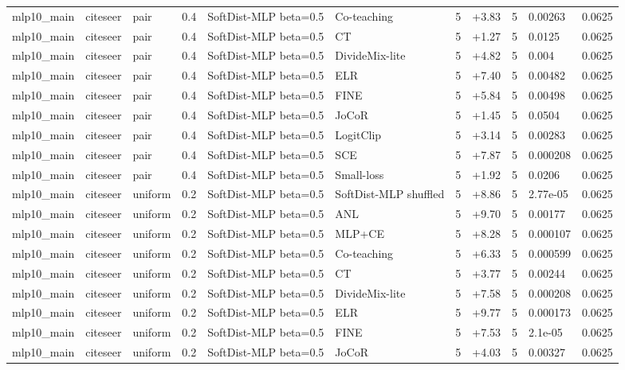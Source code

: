 \begin{table}[t]
\begin{tabular}{llllllrlrll}
mlp10_main & citeseer & pair & 0.4 & SoftDist-MLP beta=0.5 & Co-teaching & 5 & +3.83 & 5 & 0.00263 & 0.0625 \\
mlp10_main & citeseer & pair & 0.4 & SoftDist-MLP beta=0.5 & CT & 5 & +1.27 & 5 & 0.0125 & 0.0625 \\
mlp10_main & citeseer & pair & 0.4 & SoftDist-MLP beta=0.5 & DivideMix-lite & 5 & +4.82 & 5 & 0.004 & 0.0625 \\
mlp10_main & citeseer & pair & 0.4 & SoftDist-MLP beta=0.5 & ELR & 5 & +7.40 & 5 & 0.00482 & 0.0625 \\
mlp10_main & citeseer & pair & 0.4 & SoftDist-MLP beta=0.5 & FINE & 5 & +5.84 & 5 & 0.00498 & 0.0625 \\
mlp10_main & citeseer & pair & 0.4 & SoftDist-MLP beta=0.5 & JoCoR & 5 & +1.45 & 5 & 0.0504 & 0.0625 \\
mlp10_main & citeseer & pair & 0.4 & SoftDist-MLP beta=0.5 & LogitClip & 5 & +3.14 & 5 & 0.00283 & 0.0625 \\
mlp10_main & citeseer & pair & 0.4 & SoftDist-MLP beta=0.5 & SCE & 5 & +7.87 & 5 & 0.000208 & 0.0625 \\
mlp10_main & citeseer & pair & 0.4 & SoftDist-MLP beta=0.5 & Small-loss & 5 & +1.92 & 5 & 0.0206 & 0.0625 \\
mlp10_main & citeseer & uniform & 0.2 & SoftDist-MLP beta=0.5 & SoftDist-MLP shuffled & 5 & +8.86 & 5 & 2.77e-05 & 0.0625 \\
mlp10_main & citeseer & uniform & 0.2 & SoftDist-MLP beta=0.5 & ANL & 5 & +9.70 & 5 & 0.00177 & 0.0625 \\
mlp10_main & citeseer & uniform & 0.2 & SoftDist-MLP beta=0.5 & MLP+CE & 5 & +8.28 & 5 & 0.000107 & 0.0625 \\
mlp10_main & citeseer & uniform & 0.2 & SoftDist-MLP beta=0.5 & Co-teaching & 5 & +6.33 & 5 & 0.000599 & 0.0625 \\
mlp10_main & citeseer & uniform & 0.2 & SoftDist-MLP beta=0.5 & CT & 5 & +3.77 & 5 & 0.00244 & 0.0625 \\
mlp10_main & citeseer & uniform & 0.2 & SoftDist-MLP beta=0.5 & DivideMix-lite & 5 & +7.58 & 5 & 0.000208 & 0.0625 \\
mlp10_main & citeseer & uniform & 0.2 & SoftDist-MLP beta=0.5 & ELR & 5 & +9.77 & 5 & 0.000173 & 0.0625 \\
mlp10_main & citeseer & uniform & 0.2 & SoftDist-MLP beta=0.5 & FINE & 5 & +7.53 & 5 & 2.1e-05 & 0.0625 \\
mlp10_main & citeseer & uniform & 0.2 & SoftDist-MLP beta=0.5 & JoCoR & 5 & +4.03 & 5 & 0.00327 & 0.0625 \\

\end{tabular}
\end{table}
